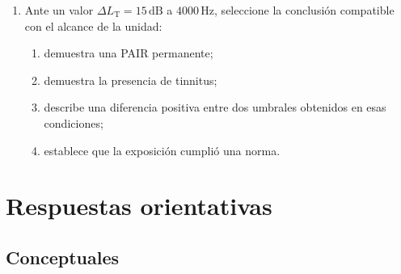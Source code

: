 \begin{enumerate}[label=\textbf{D\arabic*.},leftmargin=*]
    \item Ante un valor \(\Delta L_{\mathrm{T}}=15\,\mathrm{dB}\) a
    \(4000\,\mathrm{Hz}\), seleccione la conclusión compatible con el alcance
    de la unidad:
    \begin{enumerate}
        \item demuestra una PAIR permanente;
        \item demuestra la presencia de tinnitus;
        \item describe una diferencia positiva entre dos umbrales obtenidos en
        esas condiciones;
        \item establece que la exposición cumplió una norma.
    \end{enumerate}
\end{enumerate}

\section{Respuestas orientativas}
\label{sec:u8-respuestas}

\subsection*{Conceptuales}

